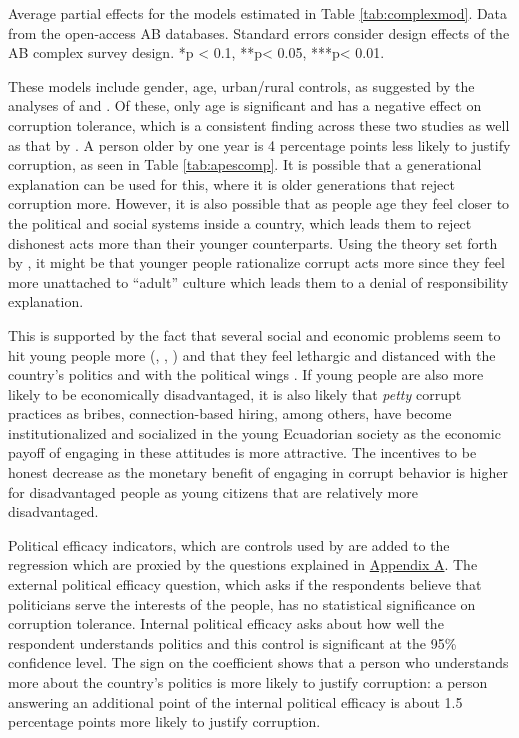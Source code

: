 \documentclass[floatsintext,man]{apa7}\usepackage[]{graphicx}\usepackage[]{color}
\begin{document}
\begin{table}[htbp]
\begin{center}
\end{center}
Average partial effects for the models estimated in Table \ref{tab:complexmod}. Data from the open-access AB databases. Standard errors consider design effects of the AB complex survey design. 
*p < 0.1, **p< 0.05, ***p< 0.01.
\end{table}

These models include gender, age, urban/rural controls, as suggested by the analyses of \textcite{Moscoso.2020} and \textcite{Lupu.2017}. Of these, only age is significant and has a negative effect on corruption tolerance, which is a consistent finding across these two studies as well as that by \textcite{Montalvo.2019}. A person older by one year is 4 percentage points less likely to justify corruption, as seen in Table \ref{tab:apescomp}. It is possible that a generational explanation can be used for this, where it is older generations that reject corruption more. However, it is also possible that as people age they feel closer to the political and social systems inside a country, which leads them to reject dishonest acts more than their younger counterparts. Using the theory set forth by \textcite{Ashforth.2003}, it might be that younger people rationalize corrupt acts more since they feel more unattached to \enquote{adult} culture which leads them to a denial of responsibility explanation. 

This is supported by the fact that several social and economic problems seem to hit young people more (\cite{Vasconez.2016}, \cite{Crespo.2019}, \cite{Cetrangolo.2020}) and that they feel lethargic and distanced with the country's politics and with the political wings \parencite{Lucero.2020}. If young people are also more likely to be economically disadvantaged, it is also likely that \textit{petty} corrupt practices as bribes, connection-based hiring, among others, have become institutionalized and socialized in the young Ecuadorian society as the economic payoff of engaging in these attitudes is more attractive. The incentives to be honest decrease as the monetary benefit of engaging in corrupt behavior is higher for disadvantaged people as young citizens that are relatively more disadvantaged. 

Political efficacy indicators, which are controls used by \textcite{Moscoso.2020} are added to the regression which are proxied by the questions explained in \hyperref[app:first]{Appendix A}. The external political efficacy question, which asks if the respondents believe that politicians serve the interests of the people, has no statistical significance on corruption tolerance. Internal political efficacy asks about how well the respondent understands politics and this control is significant at the 95\% confidence level. The sign on the coefficient shows that a person who understands more about the country's politics is more likely to justify corruption: a person answering an additional point of the internal political efficacy is about 1.5 percentage points more likely to justify corruption.
\end{document}
